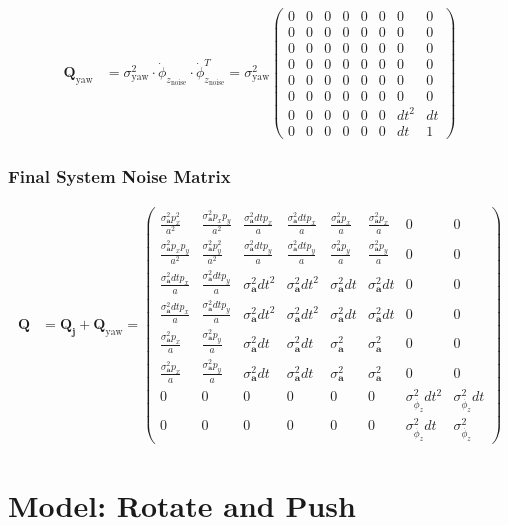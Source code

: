 \documentclass{article}
\begin{document}
\begin{align}
  \textbf{Q}_{\textrm{yaw}} &= \sigma^2_{\textrm{yaw}} \cdot \dot{\phi}_{z_\textrm{noise}} \cdot \dot{\phi}_{z_\textrm{noise}}^T
  = \sigma^2_{\textrm{yaw}} \left(\begin{matrix}0 & 0 & 0 & 0 & 0 & 0 & 0 & 0\\0 & 0 & 0 & 0 & 0 & 0 & 0 & 0\\0 & 0 & 0 & 0 & 0 & 0 & 0 & 0\\0 & 0 & 0 & 0 & 0 & 0 & 0 & 0\\0 & 0 & 0 & 0 & 0 & 0 & 0 & 0\\0 & 0 & 0 & 0 & 0 & 0 & 0 & 0\\0 & 0 & 0 & 0 & 0 & 0 & dt^{2} & dt\\0 & 0 & 0 & 0 & 0 & 0 & dt & 1\end{matrix}\right)
\end{align}

\subsubsection{Final System Noise Matrix}

\begin{align}
  \textbf{Q} &= \textbf{Q}_{\textbf{j}} + \textbf{Q}_{\textrm{yaw}}
  = \left(\begin{matrix}\frac{\sigma^2_\textbf{a} p_{x}^{2}}{a^{2}} & \frac{\sigma^2_\textbf{a} p_{x} p_{y}}{a^{2}} & \frac{\sigma^2_\textbf{a} dt p_{x}}{a} & \frac{\sigma^2_\textbf{a} dt p_{x}}{a} & \frac{\sigma^2_\textbf{a} p_{x}}{a} & \frac{\sigma^2_\textbf{a} p_{x}}{a} & 0 & 0\\\frac{\sigma^2_\textbf{a} p_{x} p_{y}}{a^{2}} & \frac{\sigma^2_\textbf{a} p_{y}^{2}}{a^{2}} & \frac{\sigma^2_\textbf{a} dt p_{y}}{a} & \frac{\sigma^2_\textbf{a} dt p_{y}}{a} & \frac{\sigma^2_\textbf{a} p_{y}}{a} & \frac{\sigma^2_\textbf{a} p_{y}}{a} & 0 & 0\\\frac{\sigma^2_\textbf{a} dt p_{x}}{a} & \frac{\sigma^2_\textbf{a} dt p_{y}}{a} & \sigma^2_\textbf{a} dt^{2} & \sigma^2_\textbf{a} dt^{2} & \sigma^2_\textbf{a} dt & \sigma^2_\textbf{a} dt & 0 & 0\\\frac{\sigma^2_\textbf{a} dt p_{x}}{a} & \frac{\sigma^2_\textbf{a} dt p_{y}}{a} & \sigma^2_\textbf{a} dt^{2} & \sigma^2_\textbf{a} dt^{2} & \sigma^2_\textbf{a} dt & \sigma^2_\textbf{a} dt & 0 & 0\\\frac{\sigma^2_\textbf{a} p_{x}}{a} & \frac{\sigma^2_\textbf{a} p_{y}}{a} & \sigma^2_\textbf{a} dt & \sigma^2_\textbf{a} dt & \sigma^2_\textbf{a} & \sigma^2_\textbf{a} & 0 & 0\\\frac{\sigma^2_\textbf{a} p_{x}}{a} & \frac{\sigma^2_\textbf{a} p_{y}}{a} & \sigma^2_\textbf{a} dt & \sigma^2_\textbf{a} dt & \sigma^2_\textbf{a} & \sigma^2_\textbf{a} & 0 & 0\\0 & 0 & 0 & 0 & 0 & 0 & \sigma_{\dot{\phi_z}}^2 dt^{2} & \sigma_{\dot{\phi_z}}^2 dt\\0 & 0 & 0 & 0 & 0 & 0 & \sigma_{\dot{\phi_z}}^2 dt & \sigma_{\dot{\phi_z}}^2\end{matrix}\right)
\end{align}
\clearpage



\section{Model: Rotate and Push}


\end{document}
